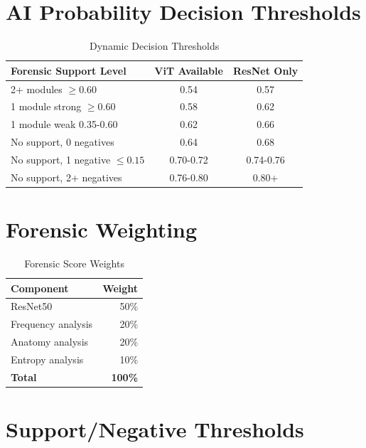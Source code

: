 \documentclass[12pt,a4paper]{book}
\begin{document}
\begin{itemize}
\section{AI Probability Decision Thresholds}

\begin{table}[H]
\centering
\captionsetup{justification=centering}
\caption{Dynamic Decision Thresholds}
\begin{tabular}{|l|c|c|}
\hline
\textbf{Forensic Support Level} & \textbf{ViT Available} & \textbf{ResNet Only} \\
\hline
2+ modules $\geq 0.60$ & 0.54 & 0.57 \\
\hline
1 module strong $\geq 0.60$ & 0.58 & 0.62 \\
\hline
1 module weak 0.35-0.60 & 0.62 & 0.66 \\
\hline
No support, 0 negatives & 0.64 & 0.68 \\
\hline
No support, 1 negative $\leq 0.15$ & 0.70-0.72 & 0.74-0.76 \\
\hline
No support, 2+ negatives & 0.76-0.80 & 0.80+ \\
\hline
\end{tabular}
\end{table}

\section{Forensic Weighting}

\begin{table}[H]
\centering
\captionsetup{justification=centering}
\caption{Forensic Score Weights}
\begin{tabular}{|l|r|}
\hline
\textbf{Component} & \textbf{Weight} \\
\hline
ResNet50 & 50\% \\
\hline
Frequency analysis & 20\% \\
\hline
Anatomy analysis & 20\% \\
\hline
Entropy analysis & 10\% \\
\hline
\textbf{Total} & \textbf{100\%} \\
\hline
\end{tabular}
\end{table}

\section{Support/Negative Thresholds}


\end{itemize}
\end{document}
